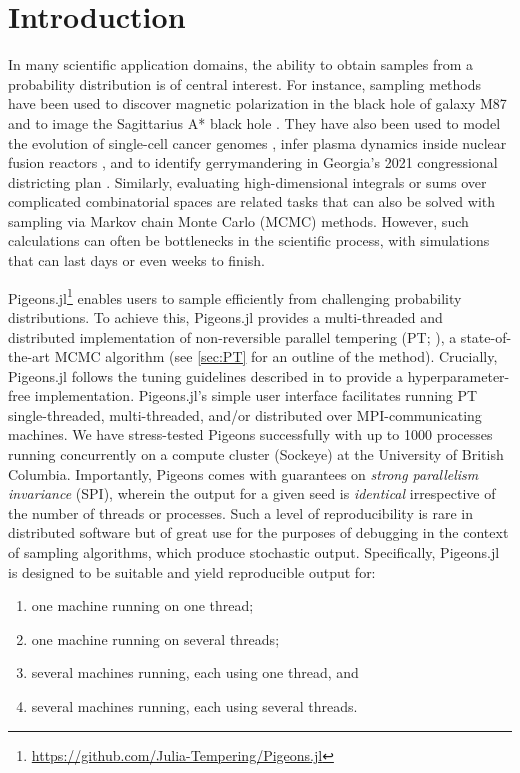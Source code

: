 \section{Introduction}
In many scientific application domains, the ability to obtain samples from a 
probability distribution is of central interest. 
For instance, sampling methods have been used to discover magnetic polarization 
in the black hole of galaxy M87 \cite{akiyama2021seven}
and to image the Sagittarius A* black hole \cite{akiyama2022first}.
They have also been used to 
model the evolution of single-cell cancer genomes \cite{salehi2021clonal}, 
infer plasma dynamics inside nuclear fusion reactors \cite{gota2021overview}, 
and to identify gerrymandering in Georgia's 2021 congressional districting plan 
\cite{zhao2022mathematically}.
Similarly, evaluating high-dimensional integrals or sums over complicated 
combinatorial spaces are related tasks that can also be solved with sampling 
via Markov chain Monte Carlo (MCMC) methods. 
However, such calculations can often be bottlenecks in the scientific process, with 
simulations that can last days or even weeks to finish. 


Pigeons.jl\footnote{\url{https://github.com/Julia-Tempering/Pigeons.jl}}
enables users to sample efficiently from challenging probability distributions.
To achieve this, Pigeons.jl provides a multi-threaded and distributed implementation
of non-reversible parallel tempering
(PT; \citealp{syed2021nrpt,syed2021paths,surjanovic2022vpt,surjanovic2024ergodicity}), 
a state-of-the-art MCMC algorithm (see \cref{sec:PT} for an outline of the method).
Crucially, Pigeons.jl follows the tuning guidelines described in \citet{syed2021nrpt} 
to provide a hyperparameter-free implementation.
Pigeons.jl's simple user interface facilitates running PT
single-threaded, multi-threaded, and/or distributed over MPI-communicating machines. 
We have stress-tested Pigeons successfully with up to 1000 processes running 
concurrently on a compute cluster (Sockeye) at the University of British Columbia.
Importantly, Pigeons comes with guarantees on \emph{strong parallelism invariance} (SPI), 
wherein the output for a given seed is \emph{identical} irrespective of the number 
of threads or processes. Such a level of reproducibility is rare in distributed 
software but of great use for the purposes of debugging in the context of sampling 
algorithms, which produce stochastic output.
Specifically, Pigeons.jl is designed to be suitable and yield reproducible output for:
\begin{enumerate}
    \item one machine running on one thread;
    \item one machine running on several threads;
    \item several machines running, each using one thread, and
    \item several machines running, each using several threads.
\end{enumerate}


